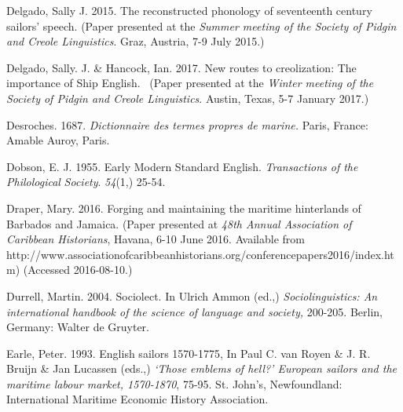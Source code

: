 \begin{styleStandard}
Delgado, Sally J. 2015. The reconstructed phonology of seventeenth century sailors’ speech. (Paper presented at the \textit{Summer meeting of the Society of Pidgin and Creole Linguistics}. Graz, Austria, 7-9 July 2015.) \ \ 
\end{styleStandard}


\begin{styleStandard}
Delgado, Sally. J. \& Hancock, Ian. 2017. New routes to creolization: The importance of Ship English. \ (Paper presented at the \textit{Winter meeting of the Society of Pidgin and Creole Linguistics}. Austin, Texas, 5-7 January 2017.) \ \ 
\end{styleStandard}


\begin{styleStandard}
Desroches. 1687. \textit{Dictionnaire des termes propres de marine. }Paris, France: Amable Auroy, Paris. \ 
\end{styleStandard}


\begin{styleStandard}
Dobson, E. J. 1955. Early Modern Standard English. \textit{Transactions of the Philological} \textit{Society}.\textit{ 54}(1,) 25-54.
\end{styleStandard}


\begin{styleStandard}
Draper, Mary. 2016. Forging and maintaining the maritime hinterlands of Barbados and Jamaica. (Paper presented at \textit{48th Annual Association of Caribbean Historians}, Havana, 6-10 June 2016. Available from http://www.associationofcaribbeanhistorians.org/conferencepapers2016/index.htm) (Accessed 2016-08-10.)
\end{styleStandard}


\begin{styleStandard}
Durrell, Martin. 2004. Sociolect. In Ulrich Ammon (ed.,) \textit{Sociolinguistics: An international handbook of the science of language and society,} 200-205. Berlin, Germany: Walter de Gruyter.
\end{styleStandard}


\begin{styleStandard}
Earle, Peter. 1993. English sailors 1570-1775, In Paul C. van Royen \& J. R. Bruijn \& Jan Lucassen (eds.,) \textit{‘Those emblems of hell?’ European sailors and the maritime labour market, 1570-1870}, 75-95. St. John’s, Newfoundland: International Maritime Economic History Association.
\end{styleStandard}


